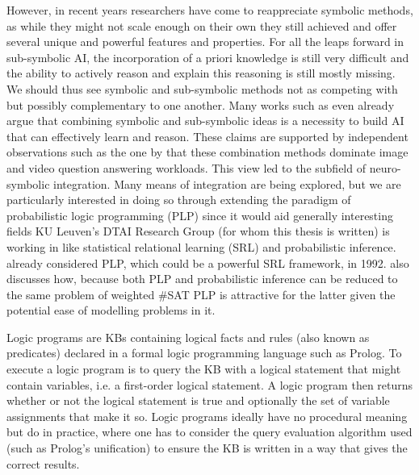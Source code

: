 However, in recent years researchers have come to reappreciate symbolic methods, as while they might not scale enough on their own they still achieved and offer several unique and powerful features and properties. For all the leaps forward in sub-symbolic AI, the incorporation of a priori knowledge is still very difficult and the ability to actively reason and explain this reasoning is still mostly missing. We should thus see symbolic and sub-symbolic methods not as competing with but possibly complementary to one another. Many works such as \cite{garcez2015neural} even already argue that combining symbolic and sub-symbolic ideas is a necessity to build AI that can effectively learn and reason. These claims are supported by independent observations such as the one by \cite{susskind2021neuro} that these combination methods dominate image and video question answering workloads. This view led to the subfield of neuro-symbolic integration. Many means of integration are being explored, but we are particularly interested in doing so through extending the paradigm of probabilistic logic programming (PLP) since it would aid generally interesting fields KU Leuven's DTAI Research Group (for whom this thesis is written) is working in like statistical relational learning (SRL) and probabilistic inference. \cite{ng1992probabilistic} already considered PLP, which could be a powerful SRL framework, in 1992. \cite{fierens2015inference} also discusses how, because both PLP and probabilistic inference can be reduced to the same problem of weighted \#SAT PLP is attractive for the latter given the potential ease of modelling problems in it. \par
Logic programs are KBs containing logical facts and rules (also known as predicates) declared in a formal logic programming language such as Prolog. To execute a logic program is to query the KB with a logical statement that might contain variables, i.e. a first-order logical statement. A logic program then returns whether or not the logical statement is true and optionally the set of variable assignments that make it so. Logic programs ideally have no procedural meaning but do in practice, where one has to consider the query evaluation algorithm used (such as Prolog's unification) to ensure the KB is written in a way that gives the correct results. \par
